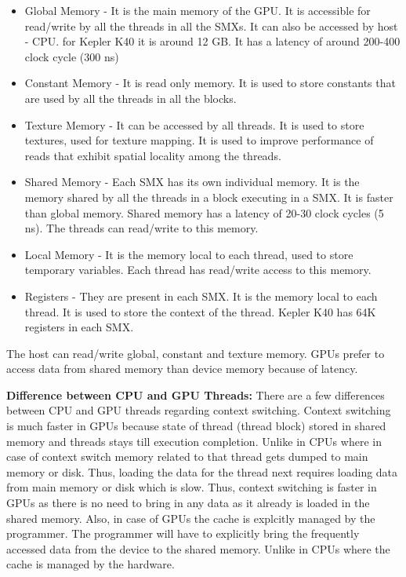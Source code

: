 \documentclass[12pt]{article}
\begin{document}
\begin{itemize}
    \item Global Memory - It is the main memory of the GPU. It is accessible for read/write by all the threads in all the SMXs. 
    It can also be accessed by host - CPU. for Kepler K40 it is around 12 GB. It has a latency of around 200-400 clock cycle (300 ns)
    \item Constant Memory - It is read only memory. It is used to store constants that are used by all the threads in all the blocks.
    \item Texture Memory - It can be accessed by all threads. It is used to store textures, used for texture mapping. It is used to improve performance of reads that exhibit spatial locality among the threads.
    \item Shared Memory - Each SMX has its own individual memory. It is the memory shared by all the threads in a block executing in a SMX. It is faster than global memory. Shared memory has a latency of 20-30 clock cycles (5 ns). The threads can read/write to this memory.
    \item Local Memory - It is the memory local to each thread, used to store temporary variables. Each thread has read/write access to this memory.
    \item Registers - They are present in each SMX. It is the memory local to each thread. It is used to store the context of the thread. Kepler K40 has 64K registers in each SMX.
\end{itemize}
The host can read/write global, constant and texture memory. GPUs prefer to access data from shared memory than device memory because of latency.

\textbf{Difference between CPU and GPU Threads: }There are a few differences between CPU and GPU threads regarding context switching.
Context switching is much faster in GPUs because state of thread (thread block) stored in shared memory and threads stays till execution completion. Unlike in CPUs
where in case of context switch memory related to that thread gets dumped to main memory or disk. Thus, loading the data for the thread next requires loading data from main memory or disk which is 
slow. Thus, context switching is faster in GPUs as there is no need to bring in any data as it already is loaded in the shared memory. Also, in case
of GPUs the cache is explcitly managed by the programmer. The programmer will have to explicitly bring the frequently accessed data from the device to the shared memory. Unlike
in CPUs where the cache is managed by the hardware.
\end{document}

